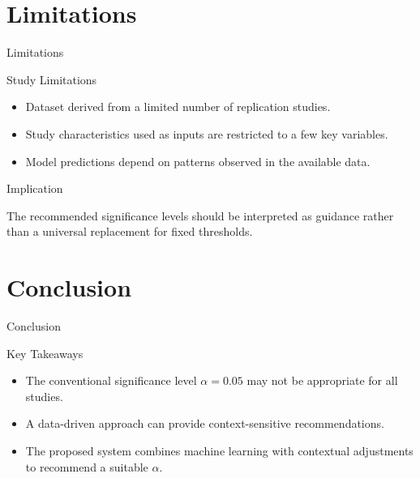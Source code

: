 \section{Limitations}
\begin{frame}{Limitations}
	
	\begin{block}{Study Limitations}
		
		\begin{itemize}
			\item Dataset derived from a limited number of replication studies.
			\item Study characteristics used as inputs are restricted to a few key variables.
			\item Model predictions depend on patterns observed in the available data.
		\end{itemize}
		
	\end{block}
	
	\vspace{0.4cm}
	
	\begin{exampleblock}{Implication}
		
		The recommended significance levels should be interpreted as guidance rather than a universal replacement for fixed thresholds.
		
	\end{exampleblock}
	
\end{frame}
\section{Conclusion}
\begin{frame}{Conclusion}
	
	\begin{block}{Key Takeaways}
		
		\begin{itemize}
			\item The conventional significance level $\alpha = 0.05$ may not be appropriate for all studies.
			\item A data-driven approach can provide context-sensitive recommendations.
			\item The proposed system combines machine learning with contextual adjustments to recommend a suitable $\alpha$.
		\end{itemize}
		
	\end{block}
	
\end{frame}

